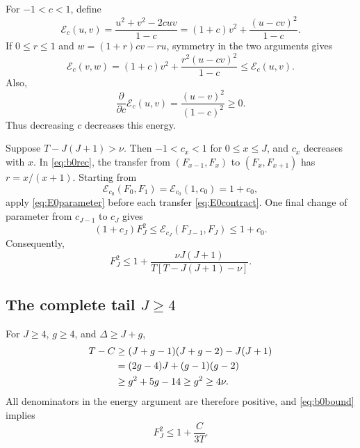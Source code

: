 \documentclass[11pt]{article}
\theoremstyle{remark}
\numberwithin{equation}{section}
\begin{document}
For $-1<c<1$, define
\begin{equation}
 \mathcal E_c(u,v)=\frac{u^2+v^2-2cuv}{1-c}
 =(1+c)v^2+\frac{(u-cv)^2}{1-c}.
 \label{eq:E0}
\end{equation}
If $0\le r\le1$ and $w=(1+r)cv-ru$, symmetry in the two arguments gives
\begin{equation}
 \mathcal E_c(v,w)
 =(1+c)v^2+\frac{r^2(u-cv)^2}{1-c}
 \le\mathcal E_c(u,v).
 \label{eq:E0contract}
\end{equation}
Also,
\begin{equation}
 \frac{\partial}{\partial c}\mathcal E_c(u,v)
 =\frac{(u-v)^2}{(1-c)^2}\ge0.
 \label{eq:E0parameter}
\end{equation}
Thus decreasing $c$ decreases this energy.

Suppose $T-J(J+1)>\nu$. Then $-1<c_x<1$ for $0\le x\le J$,
and $c_x$ decreases with $x$. In \eqref{eq:b0rec}, the transfer from
$(F_{x-1},F_x)$ to $(F_x,F_{x+1})$ has $r=x/(x+1)$. Starting from
\[
 \mathcal E_{c_0}(F_0,F_1)=\mathcal E_{c_0}(1,c_0)=1+c_0,
\]
apply \eqref{eq:E0parameter} before each transfer
\eqref{eq:E0contract}. One final change of parameter from $c_{J-1}$
to $c_J$ gives
\begin{equation}
 (1+c_J)F_J^2\le\mathcal E_{c_J}(F_{J-1},F_J)\le1+c_0.
 \label{eq:E0chain}
\end{equation}
Consequently,
\begin{equation}
 \boxed{\quad
 F_J^2\le1+\frac{\nu J(J+1)}{T[T-J(J+1)-\nu]}.
 \quad}
 \label{eq:b0bound}
\end{equation}

\subsection{The complete tail \texorpdfstring{$J\ge4$}{J>=4}}

For $J\ge4$, $g\ge4$, and $\Delta\ge J+g$,
\begin{align}
 T-C
 &\ge(J+g-1)(J+g-2)-J(J+1)\notag\\
 &=(2g-4)J+(g-1)(g-2)\notag\\
 &\ge g^2+5g-14\ge g^2\ge4\nu.
 \label{eq:b0gap}
\end{align}
All denominators in the energy argument are therefore positive, and
\eqref{eq:b0bound} implies
\begin{equation}
 F_J^2\le1+\frac{C}{3T}.
 \label{eq:b0simple}
\end{equation}
\end{document}
